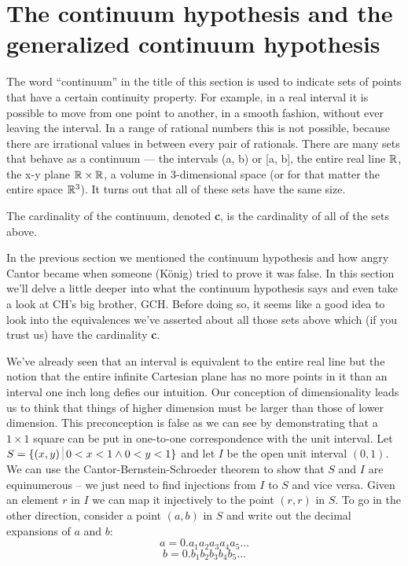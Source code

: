 \clearpage




\newpage

\section[CH and GCH]{The continuum hypothesis and the generalized continuum hypothesis}

The word ``continuum'' in the title of this section is used to indicate sets of
points that have a certain continuity property. For example, in a real interval
it is possible to move from one point to another, in a smooth fashion, without
ever leaving the interval. In a range of rational numbers this is not possible,
because there are irrational values in between every pair of rationals. There
are many sets that behave as a continuum –-- the intervals (a, b) or [a, b], the
entire real line ${\mathbb R}$, the x-y plane ${\mathbb R} \times {\mathbb R}$, a volume in 3-dimensional space (or
for that matter the entire space ${\mathbb R}^3$). It turns out that all of these sets have
the same size.

The cardinality of the continuum, denoted {\bf c}, is the cardinality of all of the
sets above. 

In the previous section we mentioned the continuum hypothesis and how
angry Cantor became when someone (K\"{o}nig) tried to prove it
was false.   In this section we'll delve a little deeper into what the
continuum hypothesis says and even take a look at CH's big brother, GCH.
Before doing so, it seems like a good idea to look into the equivalences
we've asserted about all those sets above which (if you trust us) have the
cardinality {\bf c}.

We've already seen that an interval is equivalent to the entire
real line but the notion that the entire infinite Cartesian plane has no more
points in it than an interval one inch long defies our intuition. Our conception
of dimensionality leads us to think that things of higher dimension must be
larger than those of lower dimension. This preconception is false as we can see
by demonstrating that a $1 \times 1$  square can be put in one-to-one correspondence
with the unit interval.
Let $S = \{ (x, y) \suchthat 0 < x < 1 \land  0 < y < 1 \}$ and let $I$ be 
the open unit interval $(0, 1)$.  We can use the Cantor-Bernstein-Schroeder 
theorem to show that $S$ and $I$ are equinumerous -- we just need to find 
injections from $I$ to $S$ and vice versa.  Given an element $r$ in $I$ we 
can map it injectively to the point $(r, r)$ in $S$.   To go in the other 
direction, consider a point $(a, b)$ in $S$
and write out the decimal expansions of $a$ and $b$:
\[ a = 0.a_1a_2a_3a_4a_5\ldots \]
\[ b = 0.b_1b_2b_3b_4b_5\ldots \]

